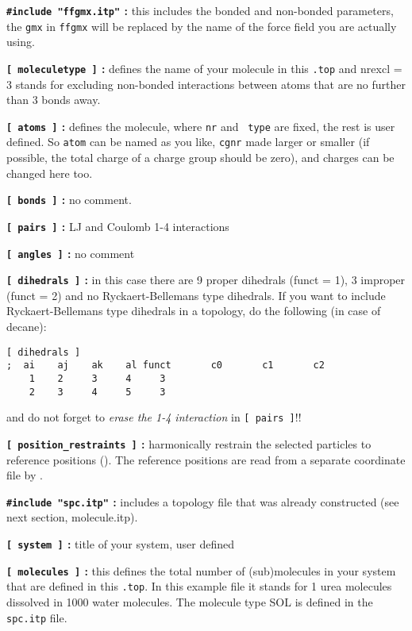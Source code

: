 {\bf {\tt \#include "ffgmx.itp"} :} this includes the bonded and
non-bonded {\gromacs} parameters, the {\tt gmx} in {\tt ffgmx} will be
replaced by the name of the force field you are actually using.

{\bf {\tt [~moleculetype~]} :} defines the name of your molecule in
this {\tt *.top} and nrexcl = 3 stands for excluding non-bonded
interactions between atoms that are no further than 3 bonds away.

{\bf {\tt [~atoms~]} :} defines the molecule, where {\tt nr} and {\tt
type} are fixed, the rest is user defined. So {\tt atom} can be named
as you like, {\tt cgnr} made larger or smaller (if possible, the total
charge of a charge group should be zero), and charges can be changed
here too.

{\bf {\tt [~bonds~]} :} no comment.

{\bf {\tt [~pairs~]} :} LJ and Coulomb 1-4 interactions

{\bf {\tt [~angles~]} :} no comment

{\bf {\tt [~dihedrals~]} :} in this case there are 9 proper dihedrals
(funct = 1), 3 improper (funct = 2) and no Ryckaert-Bellemans type
dihedrals. If you want to include Ryckaert-Bellemans type dihedrals
in a topology, do the following (in case of {\eg} decane):
\begin{verbatim}
[ dihedrals ]
;  ai    aj    ak    al funct       c0       c1       c2
    1    2     3     4     3 
    2    3     4     5     3
\end{verbatim}
and do not forget to {\em erase the 1-4 interaction} 
in {\tt [~pairs~]}!!

{\bf {\tt [~position\_restraints~]} :} harmonically restrain the selected particles
to reference positions (). 
The reference positions are read from a 
separate coordinate file by .

{\bf {\tt \#include "spc.itp"} :} includes a topology file that was already
constructed (see next section, molecule.itp).

{\bf {\tt [~system~]} :} title of your system, user defined

{\bf {\tt [~molecules~]} :} this defines the total number of (sub)molecules
in your system that are defined in this {\tt *.top}. In this
example file it stands for 1 urea molecules dissolved in 1000 water
molecules. The molecule type SOL is defined in the {\tt spc.itp} file.

